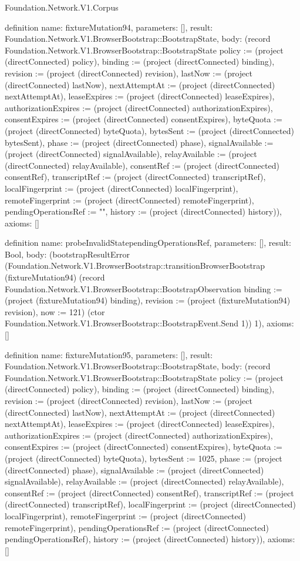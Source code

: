 \begin{lexlean}{Foundation.Network.V1.Corpus}
\begin{semanticmodule}
definition{
  name: fixtureMutation94,
  parameters: [],
  result: Foundation.Network.V1.BrowserBootstrap::BootstrapState,
  body: (record Foundation.Network.V1.BrowserBootstrap::BootstrapState {policy := (project (directConnected) policy), binding := (project (directConnected) binding), revision := (project (directConnected) revision), lastNow := (project (directConnected) lastNow), nextAttemptAt := (project (directConnected) nextAttemptAt), leaseExpires := (project (directConnected) leaseExpires), authorizationExpires := (project (directConnected) authorizationExpires), consentExpires := (project (directConnected) consentExpires), byteQuota := (project (directConnected) byteQuota), bytesSent := (project (directConnected) bytesSent), phase := (project (directConnected) phase), signalAvailable := (project (directConnected) signalAvailable), relayAvailable := (project (directConnected) relayAvailable), consentRef := (project (directConnected) consentRef), transcriptRef := (project (directConnected) transcriptRef), localFingerprint := (project (directConnected) localFingerprint), remoteFingerprint := (project (directConnected) remoteFingerprint), pendingOperationsRef := "", history := (project (directConnected) history)}),
  axioms: []
}

definition{
  name: probeInvalidStatependingOperationsRef,
  parameters: [],
  result: Bool,
  body: (bootstrapResultError (Foundation.Network.V1.BrowserBootstrap::transitionBrowserBootstrap (fixtureMutation94) (record Foundation.Network.V1.BrowserBootstrap::BootstrapObservation {binding := (project (fixtureMutation94) binding), revision := (project (fixtureMutation94) revision), now := 121}) (ctor Foundation.Network.V1.BrowserBootstrap::BootstrapEvent.Send 1)) 1),
  axioms: []
}

definition{
  name: fixtureMutation95,
  parameters: [],
  result: Foundation.Network.V1.BrowserBootstrap::BootstrapState,
  body: (record Foundation.Network.V1.BrowserBootstrap::BootstrapState {policy := (project (directConnected) policy), binding := (project (directConnected) binding), revision := (project (directConnected) revision), lastNow := (project (directConnected) lastNow), nextAttemptAt := (project (directConnected) nextAttemptAt), leaseExpires := (project (directConnected) leaseExpires), authorizationExpires := (project (directConnected) authorizationExpires), consentExpires := (project (directConnected) consentExpires), byteQuota := (project (directConnected) byteQuota), bytesSent := 1025, phase := (project (directConnected) phase), signalAvailable := (project (directConnected) signalAvailable), relayAvailable := (project (directConnected) relayAvailable), consentRef := (project (directConnected) consentRef), transcriptRef := (project (directConnected) transcriptRef), localFingerprint := (project (directConnected) localFingerprint), remoteFingerprint := (project (directConnected) remoteFingerprint), pendingOperationsRef := (project (directConnected) pendingOperationsRef), history := (project (directConnected) history)}),
  axioms: []
}


\end{semanticmodule}
\end{lexlean}
